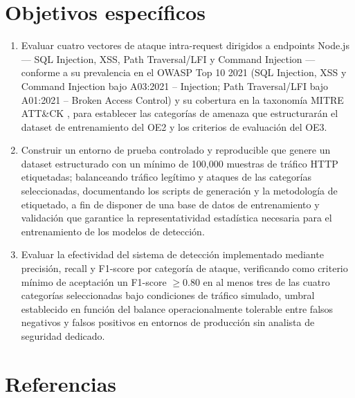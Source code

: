 \section{Objetivos específicos}
\begin{enumerate}
    \item Evaluar cuatro vectores de ataque intra-request dirigidos a endpoints Node.js — SQL
    Injection, XSS, Path Traversal/LFI y Command Injection — conforme a su prevalencia en el
    OWASP Top 10 2021 \cite{owasp2021} (SQL Injection, XSS y Command Injection bajo A03:2021 --
    Injection; Path Traversal/LFI bajo A01:2021 -- Broken Access Control) y su cobertura en la
    taxonomía MITRE ATT\&CK \cite{mitreattack}, para establecer las categorías de amenaza que
    estructurarán el dataset de entrenamiento del OE2 y los criterios de evaluación del OE3.

    \item Construir un entorno de prueba controlado y reproducible que genere un dataset
    estructurado con un mínimo de 100{,}000 muestras de tráfico HTTP etiquetadas; balanceando
    tráfico legítimo y ataques de las categorías seleccionadas, documentando los scripts de
    generación y la metodología de etiquetado, a fin de disponer de una base de datos de
    entrenamiento y validación que garantice la representatividad estadística necesaria para el
    entrenamiento de los modelos de detección.

    \item Evaluar la efectividad del sistema de detección implementado mediante precisión, recall
    y F1-score por categoría de ataque, verificando como criterio mínimo de aceptación un
    F1-score $\geq 0.80$ en al menos tres de las cuatro categorías seleccionadas bajo condiciones
    de tráfico simulado, umbral establecido en función del balance operacionalmente tolerable
    entre falsos negativos y falsos positivos en entornos de producción sin analista de seguridad
    dedicado.
\end{enumerate}

\ifdefined\modoensamble
\else
	\section*{Referencias}
	\printbibliography[heading=none]
	
\fi
